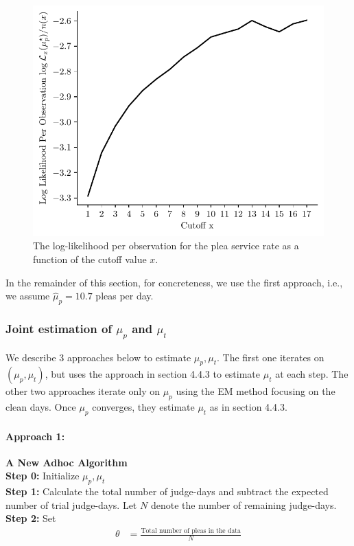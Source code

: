 \documentclass[11pt, oneside]{article}   	%
\theoremstyle{ModifiedStyle}
\begin{document}
\begin{figure}[H]
	\centering
	\includegraphics[scale=0.75]{Figures/Log_Likelihood_Per_Observation_Top}
	\caption{The log-likelihood per observation for the plea service rate as a function of the cutoff value $x$.}
	\vspace{-2mm}
	\label{Figure_Plea_Service_Rate_Log_Likelihood_Per_Observation}
\end{figure}
%
In the remainder of this section, for concreteness, we use the first approach, i.e., we assume $\hat{\mu}_p = 10.7$ pleas per day.

\subsubsection{Joint estimation of $\mu_p$ and $\mu_t$}
We describe 3 approaches below to estimate $\mu_p, \mu_t$. The first one iterates on $(\mu_p, \mu_t)$, but uses the approach in section 4.4.3 to estimate $\mu_t$ at each step. The other two approaches iterate only on $\mu_p$ using the EM method focusing on the clean days. Once $\mu_p$ converges, they estimate $\mu_t$ as in section 4.4.3.

\paragraph{Approach 1:} \textbf{A New Adhoc Algorithm} \\
\textbf{Step 0:} Initialize $\mu_p,\mu_t$\\
\textbf{Step 1:} Calculate the total number of judge-days and subtract the expected number of trial judge-days. Let $N$ denote the number of remaining judge-days.\\
\textbf{Step 2:} Set
\begin{align*}
	\theta &= \frac{\text{Total number of pleas in the data}}{N}
\end{align*}
\end{document}
